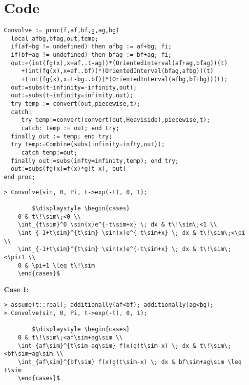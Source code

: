 \section{Code}

\begin{lstlisting}[frame=single, mathescape]
Convolve := proc(f,af,bf,g,ag,bg)
  local afbg,bfag,out,temp;
  if(af+bg != undefined) then afbg := af+bg; fi;
  if(bf+ag != undefined) then bfag := bf+ag; fi;
  out:=(int(fg(x),x=af..t-ag))*(OrientedInterval(af+ag,bfag))(t)
     +(int(fg(x),x=af..bf))*(OrientedInterval(bfag,afbg))(t)
     +(int(fg(x),x=t-bg..bf))*(OrientedInterval(afbg,bf+bg))(t);
  out:=subs(t-infinity=-infinity,out);
  out:=subs(t+infinity=infinity,out);
  try temp := convert(out,piecewise,t);
  catch: 
     try temp:=convert(convert(out,Heaviside),piecewise,t);
     catch: temp := out; end try;  
  finally out := temp; end try;
  try temp:=Combine(subs(infinity=infty,out));
     catch temp:=out;
  finally out:=subs(infty=infinity,temp); end try;
  out:=subs(fg(x)=f(x)*g(t-x), out)
end proc;
\end{lstlisting}


\begin{lstlisting}[frame=single, mathescape]
> Convolve(sin, 0, Pi, t->exp(-t), 0, 1);

		$\displaystyle \begin{cases}
	0 & t\!\sim\;<0 \\
	\int_{t\sim}^0 \sin(x)e^{-t\sim+x} \; dx & t\!\sim\;<1 \\
	\int_{-1+t\sim}^{t\sim} \sin(x)e^{-t\sim+x} \; dx & t\!\sim\;<\pi \\
	\int_{-1+t\sim}^{t\sim} \sin(x)e^{-t\sim+x} \; dx & t\!\sim\;<\pi+1 \\
	0 & \pi+1 \leq t\!\sim
	\end{cases}$
\end{lstlisting}

\textbf{Case 1:}
\begin{lstlisting}[frame=single, mathescape]
> assume(t::real); additionally(af<bf); additionally(ag<bg);
> Convolve(sin, 0, Pi, t->exp(-t), 0, 1);

		$\displaystyle \begin{cases}
	0 & t\!\sim\;<af\sim+ag\sim \\
	\int_{af\sim}^{t\sim-ag\sim} f(x)g(t\sim-x) \; dx & t\!\sim\;<bf\sim+ag\sim \\
	\int_{af\sim}^{bf\sim} f(x)g(t\sim-x) \; dx & bf\sim+ag\sim \leq t\sim
	\end{cases}$
\end{lstlisting}



